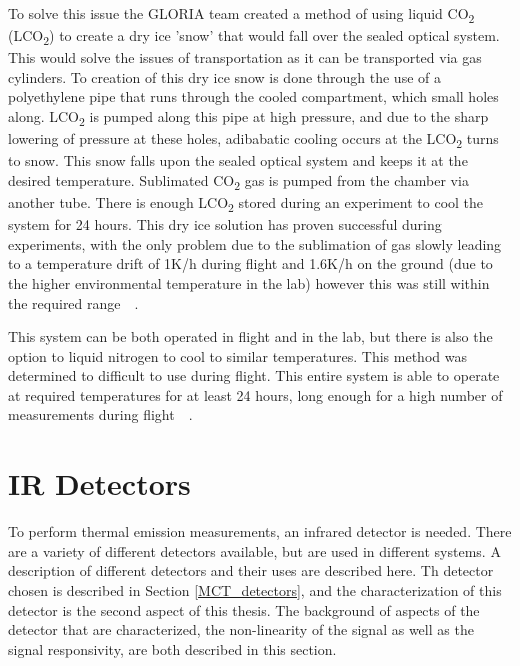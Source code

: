 To solve this issue the GLORIA team created a method of using liquid CO\textsubscript{2} (LCO\textsubscript{2}) to create a dry ice 'snow' that would fall over the sealed optical system. This would solve the issues of transportation as it can be transported via gas cylinders. To creation of this dry ice snow is done through the use of a polyethylene pipe that runs through the cooled compartment, which small holes along. LCO\textsubscript{2} is pumped along this pipe at high pressure, and due to the sharp lowering of pressure at these holes, adibabatic cooling occurs at the LCO\textsubscript{2} turns to snow. This snow falls upon the sealed optical system and keeps it at the desired temperature. Sublimated CO\textsubscript{2} gas is pumped from the chamber via another tube. There is enough LCO\textsubscript{2} stored during an experiment to cool the system for 24 hours. This dry ice solution has proven successful during experiments, with the only problem due to the sublimation of gas slowly leading to a temperature drift of 1K/h during flight and 1.6K/h on the ground (due to the higher environmental temperature in the lab) however this was still within the required range~\citep{GLORIA_concept}~\citep{GLORIA_thermalmech}.

This system can be both operated in flight and in the lab, but there is also the option to liquid nitrogen to cool to similar temperatures. This method was determined to difficult to use during flight. This entire system is able to operate at required temperatures for at least 24 hours, long enough for a high number of measurements during flight~\citep{GLORIA_concept}~\citep{GLORIA_thermalmech}.

\section{IR Detectors}
To perform thermal emission measurements, an infrared detector is needed. There are a variety of different detectors available, but are used in different systems. A description of different detectors and their uses are described here. Th detector chosen is described in Section \ref{MCT_detectors}, and the characterization of this detector is the second aspect of this thesis. The background of aspects of the detector that are characterized, the non-linearity of the signal as well as the signal responsivity, are both described in this section.

